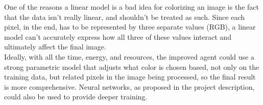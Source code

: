 \documentclass[12pt]{report}
\begin{document}
One of the reasons a linear model is a bad idea for colorizing an image is the fact that the data isn't really linear, and shouldn't be treated as such. Since each pixel, in the end, has to be represented by three separate values (RGB), a linear model can't accurately express how all three of these values interact and ultimately affect the final image.\\
Ideally, with all the time, energy, and resources, the improved agent could use a strong parametric model that adjusts what color is chosen based, not only on the training data, but related pixels in the image being processed, so the final result is more comprehensive. Neural networks, as proposed in the project description, could also be used to provide deeper training.
\end{document}
